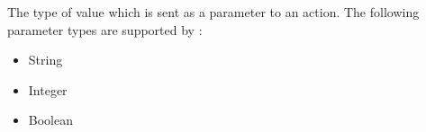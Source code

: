 \item[Parameter Type]{
The type of value which is sent as a parameter to an action.
The following parameter types are supported by \jb{}:
\begin{itemize}
\item String
\item Integer
\item Boolean
\end{itemize}
}


